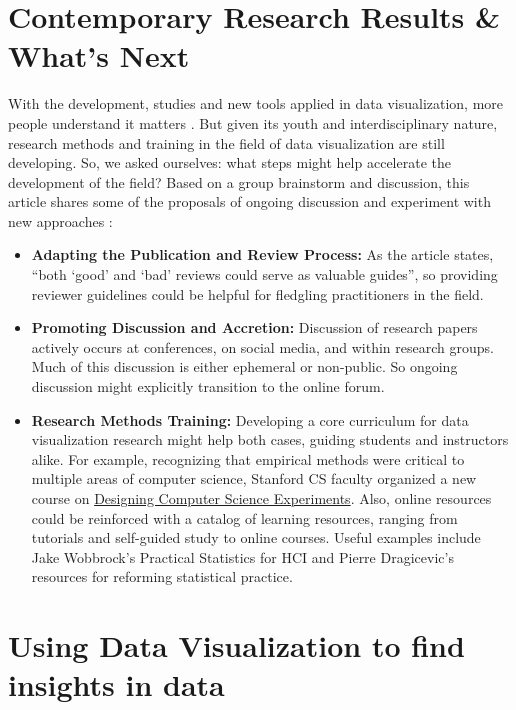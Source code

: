 \documentclass[]{book}
\providecommand{\tightlist}{%
  \setlength{\itemsep}{0pt}\setlength{\parskip}{0pt}}
\theoremstyle{definition}
\theoremstyle{definition}
\theoremstyle{definition}
\theoremstyle{remark}
\begin{document}
\section{Contemporary Research Results \& What's
Next}\label{contemporary-research-results-whats-next}

With the development, studies and new tools applied in data
visualization, more people understand it matters \citep{next_steps} .
But given its youth and interdisciplinary nature, research methods and
training in the field of data visualization are still developing. So, we
asked ourselves: what steps might help accelerate the development of the
field? Based on a group brainstorm and discussion, this article shares
some of the proposals of ongoing discussion and experiment with new
approaches \citep{next_steps}:

\begin{itemize}
\tightlist
\item
  \textbf{Adapting the Publication and Review Process:} As the article
  states, ``both `good' and `bad' reviews could serve as valuable
  guides'', so providing reviewer guidelines could be helpful for
  fledgling practitioners in the field.
\item
  \textbf{Promoting Discussion and Accretion:} Discussion of research
  papers actively occurs at conferences, on social media, and within
  research groups. Much of this discussion is either ephemeral or
  non-public. So ongoing discussion might explicitly transition to the
  online forum.
\item
  \textbf{Research Methods Training:} Developing a core curriculum for
  data visualization research might help both cases, guiding students
  and instructors alike. For example, recognizing that empirical methods
  were critical to multiple areas of computer science, Stanford CS
  faculty organized a new course on
  \href{http://sing.stanford.edu/cs303-sp11/}{Designing Computer Science
  Experiments}. Also, online resources could be reinforced with a
  catalog of learning resources, ranging from tutorials and self-guided
  study to online courses. Useful examples include Jake Wobbrock's
  Practical Statistics for HCI and Pierre Dragicevic's resources for
  reforming statistical practice.
\end{itemize}

\section{Using Data Visualization to find insights in
data}\label{using-data-visualization-to-find-insights-in-data}
\end{document}
